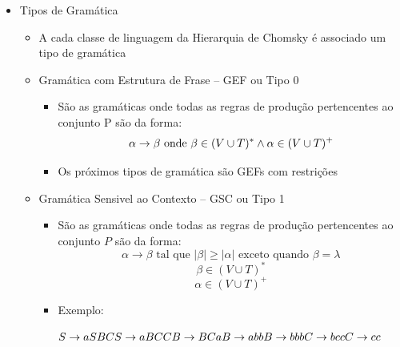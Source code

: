 \documentclass[12pt]{article}
\begin{document}
\begin{itemize}
\begin{itemize}
        pela gramática ou a própria sentença
        \item Sentença: uma fora sentencial $\alpha$, é uma sentença de $G$ se 
        e somente se $\alpha \in T^*$. Portanto, as cadeias terminais geradas 
        pela gramática são as sentenças de $G$
    \end{itemize}
    \item Tipos de Gramática
    \begin{itemize}
        \item A cada classe de linguagem da Hierarquia de Chomsky é associado 
        um tipo de gramática
        \item Gramática com Estrutura de Frase -- GEF ou Tipo 0
        \begin{itemize}
            \item São as gramáticas onde todas as regras de produção 
            pertencentes ao conjunto P são da forma:
            \[
            \alpha \rightarrow \beta \text{ onde } \beta \in (V\cup T)^* \wedge \\
                                                \alpha \in (V\cup T)^+
            \]
            \item Os próximos tipos de gramática são GEFs com restrições
        \end{itemize}
        \item Gramática Sensivel ao Contexto -- GSC ou Tipo 1
        \begin{itemize}
            \item São as gramáticas onde todas as regras de produção 
            pertencentes ao conjunto $P$ são da forma:
            \[
            \alpha \rightarrow \beta \text{ tal que }|\beta|\geq |\alpha| 
            \text{ exceto quando } \beta = \lambda \]
            \[
            \beta \in (V\cup T)^* \]
            \[
            \alpha \in (V\cup T)^+
            \]
            \item Exemplo:
            
            \( S \rightarrow aSBC \\
            S \rightarrow aBC \\
            CB \rightarrow BC \\
            aB \rightarrow ab \\
            bB \rightarrow bb \\
            bC \rightarrow bc \\
            cC \rightarrow cc \)


\end{itemize}
\end{itemize}
\end{itemize}
\end{document}

